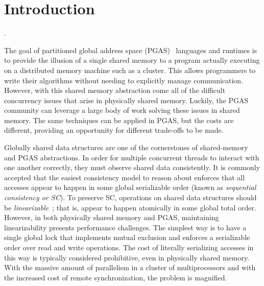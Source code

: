 \section{Introduction}
.

The goal of partitioned global address space (PGAS)~\cite{upc:2005} languages and runtimes is to provide the illusion of a single shared memory to a program actually executing on a distributed memory machine such as a cluster. This allows programmers to write their algorithms without needing to explicitly manage communication. 
However, with this shared memory abstraction come all of the difficult concurrency issues that arise in physically shared memory. Luckily, the PGAS community can leverage a large body of work solving these issues in shared memory.
The same techniques can be applied in PGAS, but the costs are different, providing an opportunity for different trade-offs to be made.

Globally shared data structures are one of the cornerstones of shared-memory and PGAS abstractions. 
In order for multiple concurrent threads to interact with one another correctly, they must observe shared data consistently. It is commonly accepted that the easiest consistency model to reason about enforces that all accesses appear to happen in some global serializable order (known as \emph{sequential consistency or SC}).
To preserve SC, operations on shared data structures should be \emph{linearizable}~\cite{herlihy1990linearizability}; that is, appear to happen atomically in some global total order.
However, in both physically shared memory and PGAS, maintaining linearizability presents performance challenges.
The simplest way is to have a single global lock that implements mutual exclusion and enforces a serializable order over read and write operations. The cost of literally serializing accesses in this way is typically considered prohibitive, even in physically shared memory.
With the massive amount of parallelism in a cluster of multiprocessors and with the increased cost of remote synchronization, the problem is magnified.

